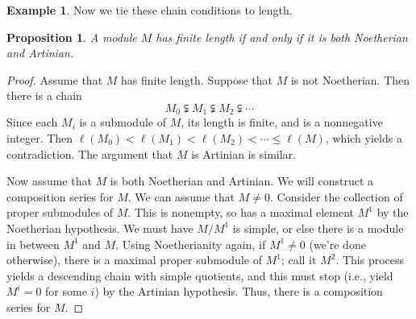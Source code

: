 \documentclass{amsart}[12pt]
\newcommand{\Z}{\mathbb{Z}}
\newcommand{\DEF}[1]{\emph{#1}\index{#1}}
\numberwithin{equation}{section}
\theoremstyle{plain} %
\newtheorem{prop}[equation]{Proposition}
\theoremstyle{definition}
\newtheorem{defn}[equation]{Definition}
\newtheorem{ex}[equation]{Example}
\theoremstyle{remark}
\newcommand{\ssec}[1]{\subsection{#1}}
\begin{document}
\begin{ex}
Now we tie these chain conditions to length.

\begin{prop} A module $M$ has finite length if and only if it is both Noetherian and Artinian.
\end{prop}
\begin{proof}
Assume that $M$ has finite length. Suppose that $M$ is not Noetherian. Then there is a chain 
\[ M_0 \subsetneqq M_1 \subsetneqq M_2 \subsetneqq  \cdots\]
Since each $M_i$ is a submodule of $M$, its length is finite, and is a nonnegative integer. Then $\ell(M_0) < \ell(M_1) < \ell(M_2) < \cdots \leq \ell(M)$, which yields a contradiction. The argument that $M$ is Artinian is similar.

Now assume that $M$ is both Noetherian and Artinian. We will construct a composition series for $M$. We can assume that $M\neq 0$. Consider the collection of proper submodules of $M$. This is nonempty, so has a maximal element $M^1$ by the Noetherian hypothesis. We must have $M/M^1$ is simple, or else there is a module in between $M^1$ and $M$. Using Noetherianity again, if $M^1\neq 0$ (we're done otherwise), there is a maximal proper submodule of $M^1$; call it $M^2$. This process yields a descending chain with simple quotients, and this must stop (i.e., yield $M^i=0$ for some $i$) by the Artinian hypothesis. Thus, there is a composition series for $M$.
\end{proof}

\begin{comment}
\ssec{Semisimple modules}

We now study an important condition that is somewhat orthogonal (yet somewhat related) to our chain conditions. The condition of finite length, and to some extent the Noetherian and Artinian conditions, were related to how a module is made out of building blocks, or how big it is in terms of its pieces. The condition of semisimplicity says that a module is composed of basic building blocks in the simplest possible way.

\begin{defn} For any ring $R$, a left $R$-module $M$ is called \DEF{semisimple} if it is a (possibly infinite) direct sum of simple modules. The empty direct sum is allowed, so that the $0$ module {\em is} considered to be semisimple. %
\end{defn}


\begin{ex} Let $M$ be a finitely general $\Z$-module. Then by the FTFGAG, $M$ is isomorphic to
  $\Z^r \oplus \Z/p_1^{e_1} \oplus \cdots \oplus \Z/p_n^{e_n}$ for some $r \geq 0$, $n \geq 0$, primes $p_i$ and positive integers $e_i$.
  Such a module is semisimple if and only if $r = 0$ and $e_i = 1$ for all $i$.
\end{ex}






\end{comment}
\end{ex}
\end{document}

